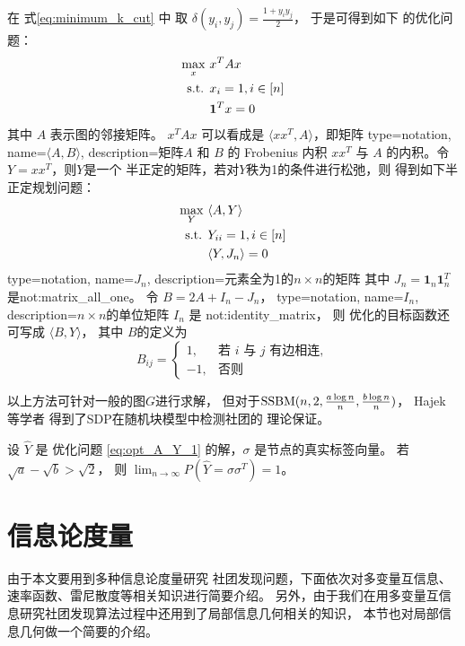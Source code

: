 在 式\eqref{eq:minimum_k_cut} 中
取 $\delta(y_i, y_j) = \frac{1+y_iy_j}{2}$，
于是可得到如下
的优化问题：
\begin{align}
  \max_x\  &  x^T A x \notag \\
  \textrm{s.t. } & x_{i} = 1, i \in [n] \notag \\
  & \mathbf{1}^T x = 0
\end{align}
其中 $A$ 表示图的邻接矩阵。
$ x^T A x $ 可以看成是 $\langle xx^T, A \rangle $，即矩阵
{
  type=notation,
  name={$\langle A, B \rangle $},
  description={矩阵$A$ 和 $B$ 的 Frobenius 内积}
}
$xx^T$ 与 $A$ 的内积。令$Y=xx^T$，则$Y$是一个
半正定的矩阵，若对$Y$秩为1的条件进行松弛，则
得到如下半正定规划问题：
\begin{align}\label{eq:opt_A_Y_1}
  \max_Y\  & \langle A, Y \rangle  \notag \\
  \textrm{s.t. } & Y_{ii} = 1, i \in [n] \notag \\
  & \langle Y, J_n \rangle  = 0
\end{align}
{
  type=notation,
  name={$J_n$},
  description={元素全为1的$n\times n$的矩阵}
}
其中 $J_n=\mathbf{1}_n\mathbf{1}_n^T$
是\glsdesc{not:matrix_all_one}。
令 $B=2A + I_n - J_n$，
{
  type=notation,
  name={$I_n$},
  description={$n\times n$的单位矩阵}
}
$I_n$ 是 \glsdesc{not:identity_matrix}，
则
优化的目标函数还可写成 $ \langle B, Y \rangle $，
其中 $B$的定义为
\begin{equation}\label{eq:def_B_sdp}
    B_{ij} = \begin{cases}
        1, & \text{若 $i$ 与 $j$ 有边相连}, \\
        -1,& \text{否则}
    \end{cases}
\end{equation}  

以上方法可针对一般的图$G$进行求解，
但对于$\operatorname{SSBM}(n,2, \frac{a \log n}{n}, \frac{b \log n}{n})$，
Hajek 等学者 \cite{hajek2016achieving} 得到了SDP在随机块模型中检测社团的
理论保证。
\begin{theorem}
  设 $\hat{Y}$ 是
  优化问题 \eqref{eq:opt_A_Y_1} 的解，$\sigma$ 是节点的真实标签向量。
  若 $\sqrt{a} - \sqrt{b}
  > \sqrt{2}$，
  则
  $\lim_{n\to\infty} P(\hat{Y}=\sigma\sigma^T)=1$。
\end{theorem}
\section{信息论度量}
由于本文要用到多种信息论度量研究
社团发现问题，下面依次对多变量互信息、速率函数、雷尼散度等相关知识进行简要介绍。
另外，由于我们在用多变量互信息研究社团发现算法过程中还用到了局部信息几何相关的知识，
本节也对局部信息几何做一个简要的介绍。
